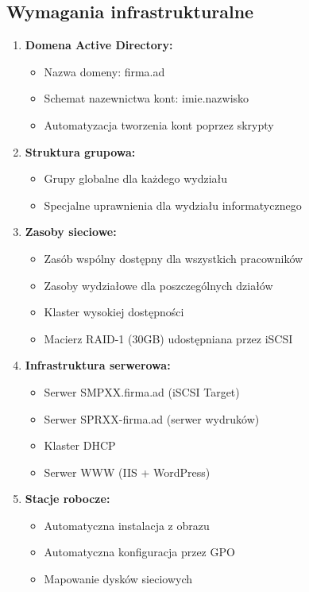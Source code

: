 \subsection{Wymagania infrastrukturalne}
\begin{enumerate}
    \item \textbf{Domena Active Directory:}
    \begin{itemize}
        \item Nazwa domeny: firma.ad
        \item Schemat nazewnictwa kont: imie.nazwisko
        \item Automatyzacja tworzenia kont poprzez skrypty
    \end{itemize}

    \item \textbf{Struktura grupowa:}
    \begin{itemize}
        \item Grupy globalne dla każdego wydziału
        \item Specjalne uprawnienia dla wydziału informatycznego
    \end{itemize}

    \item \textbf{Zasoby sieciowe:}
    \begin{itemize}
        \item Zasób wspólny dostępny dla wszystkich pracowników
        \item Zasoby wydziałowe dla poszczególnych działów
        \item Klaster wysokiej dostępności
        \item Macierz RAID-1 (30GB) udostępniana przez iSCSI
    \end{itemize}

    \item \textbf{Infrastruktura serwerowa:}
    \begin{itemize}
        \item Serwer SMPXX.firma.ad (iSCSI Target)
        \item Serwer SPRXX-firma.ad (serwer wydruków)
        \item Klaster DHCP
        \item Serwer WWW (IIS + WordPress)
    \end{itemize}

    \item \textbf{Stacje robocze:}
    \begin{itemize}
        \item Automatyczna instalacja z obrazu
        \item Automatyczna konfiguracja przez GPO
        \item Mapowanie dysków sieciowych
    \end{itemize}
\end{enumerate}

